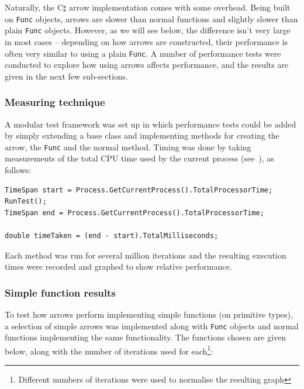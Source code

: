 \documentclass[12pt,twoside,notitlepage]{report}
\begin{document}
Naturally, the C$\sharp$ arrow implementation comes with some overhead. Being built on \texttt{Func} objects, arrows are slower than normal functions and slightly slower than plain \texttt{Func} objects. However, as we will see below, the difference isn't very large in most cases -- depending on how arrows are constructed, their performance is often very similar to using a plain \texttt{Func}. A number of performance tests were conducted to explore how using arrows affects performance, and the results are given in the next few sub-sections.

\subsubsection{Measuring technique}

A modular test framework was set up in which performance tests could be added by simply extending a base class and implementing methods for creating the arrow, the \texttt{Func} and the normal method. Timing was done by taking measurements of the total CPU time used by the current process (see~\cite{total_processor_time}), as follows:

\begin{lstlisting}[language={[sharp]C}]
TimeSpan start = Process.GetCurrentProcess().TotalProcessorTime;
RunTest();
TimeSpan end = Process.GetCurrentProcess().TotalProcessorTime;

double timeTaken = (end - start).TotalMilliseconds;
\end{lstlisting}

Each method was run for several million iterations and the resulting execution times were recorded and graphed to show relative performance.

\subsubsection{Simple function results}

To test how arrows perform implementing simple functions (on primitive types), a selection of simple arrows was implemented along with \texttt{Func} objects and normal functions implementing the same functionality. The functions chosen are given below, along with the number of iterations used for each\footnote{Different numbers of iterations were used to normalise the resulting graph}:
\end{document}
